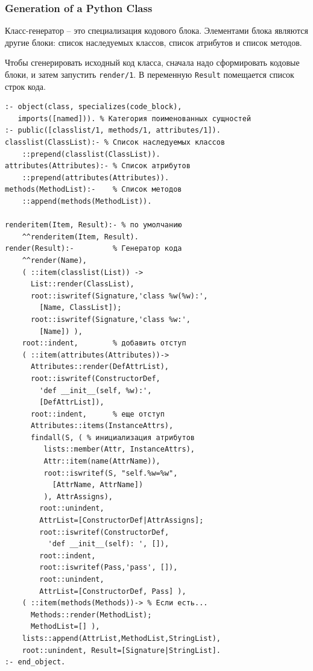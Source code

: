 \documentclass[10pt]{beamer}
\begin{document}
\begin{frame}[fragile]
  \frametitle{Generation of a Python Class}
  Класс-генератор -- это специализация кодового блока.  Элементами блока являются другие блоки: список наследуемых классов, список атрибутов и список методов.

  Чтобы сгенерировать исходный код класса, сначала надо сформировать кодовые блоки, и затем запустить \verb|render/1|. В переменную \verb|Result| помещается список строк кода.
\begin{multicols}{2}
\begin{verbatim}
:- object(class, specializes(code_block),
   imports([named])). % Категория поименованных сущностей
:- public([classlist/1, methods/1, attributes/1]).
classlist(ClassList):- % Список наследуемых классов
    ::prepend(classlist(ClassList)).
attributes(Attributes):- % Список атрибутов
    ::prepend(attributes(Attributes)).
methods(MethodList):-    % Список методов
    ::append(methods(MethodList)).

renderitem(Item, Result):- % по умолчанию
    ^^renderitem(Item, Result).
render(Result):-         % Генератор кода
    ^^render(Name),
    ( ::item(classlist(List)) ->
      List::render(ClassList),
      root::iswritef(Signature,'class %w(%w):',
        [Name, ClassList]);
      root::iswritef(Signature,'class %w:',
        [Name]) ),
    root::indent,        % добавить отступ
    ( ::item(attributes(Attributes))->
      Attributes::render(DefAttrList),
      root::iswritef(ConstructorDef,
        'def __init__(self, %w):',
        [DefAttrList]),
      root::indent,      % еще отступ
      Attributes::items(InstanceAttrs),
      findall(S, ( % инициализация атрибутов
         lists::member(Attr, InstanceAttrs),
         Attr::item(name(AttrName)),
         root::iswritef(S, "self.%w=%w",
           [AttrName, AttrName])
         ), AttrAssigns),
        root::unindent,
        AttrList=[ConstructorDef|AttrAssigns];
        root::iswritef(ConstructorDef,
          'def __init__(self): ', []),
        root::indent,
        root::iswritef(Pass,'pass', []),
        root::unindent,
        AttrList=[ConstructorDef, Pass] ),
    ( ::item(methods(Methods))-> % Если есть...
      Methods::render(MethodList);
      MethodList=[] ),
    lists::append(AttrList,MethodList,StringList),
    root::unindent, Result=[Signature|StringList].
:- end_object.
\end{verbatim}
\end{multicols}
\end{frame}
\end{document}
